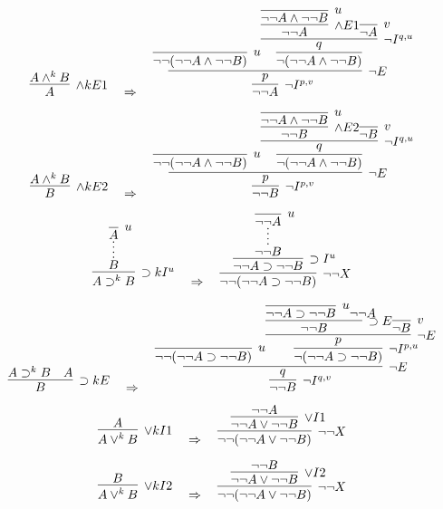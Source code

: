 \documentclass{article}
\begin{document}
\vspace{3em}
\[
\infer[\land kE1]{A}{
  A \land^k B
}
\quad \Rightarrow \quad
\infer[\neg I^{p,v}]{ \neg \neg A}{ 
  \infer[\neg E]{ p}{
    \infer[u]{
        \neg \neg (\neg \neg A \land \neg \neg B)
     }{}
     \infer[]{
        \neg (\neg \neg A \land \neg \neg B)
     }{
        \infer[\neg I^{q,u}]{ q}{
            \infer[\land E1]{\neg \neg A }{
                \infer[u]{\neg \neg A \land \neg \neg B}{}
            }
            \infer[v]{\neg A}{}
        }
     }
  }
}
\]

\vspace{3em}
\[
\infer[\land kE2]{B}{
  A \land^k B
}
\quad \Rightarrow \quad
\infer[\neg I^{p,v}]{\neg \neg B}{ 
  \infer[\neg E]{p}{
    \infer[u]{
        \neg \neg (\neg \neg A \land \neg \neg B)
     }{}
     \infer[]{
        \neg (\neg \neg A \land \neg \neg B)
     }{
        \infer[\neg I^{q,u}]{ q}{
            \infer[\land E2]{\neg \neg B }{
                \infer[u]{\neg \neg A \land \neg \neg B}{}
            }
            \infer[v]{\neg B}{}
        }
     }
  }
}
\]

\vspace{3em}
\[
\infer[\supset k I^u]{A \supset^k B}{
  \infer*[]{B}{
    \infer[u]{A}{}
  }
}
\quad \Rightarrow \quad
\infer[\neg \neg X ] {\neg \neg(\neg \neg A \supset \neg \neg B )}{
\infer[\supset  I^u]{\neg \neg A \supset \neg \neg B}{
  \infer*[]{\neg \neg B}{
    \infer[u]{\neg \neg A}{}
  }
}
}
\]

\vspace{3em}
\[
\infer[\supset kE]{B}{
    A \supset^k B & A
}
\quad \Rightarrow \quad
\infer[\neg I^{q,v}] {\neg \neg B }{
\infer[\neg E]{q}{
    \infer[u]{\neg \neg(\neg \neg A \supset \neg \neg B )}{}
    \infer[\neg I^{p,u}]{\neg(\neg \neg A \supset \neg \neg B )}{
        \infer[\neg E]{p}{
            \infer[\supset E]{\neg \neg B}{
                \infer[u]{\neg \neg A \supset \neg \neg B}{}
                {\neg \neg A}
            }
            \infer[v]{\neg B}{}
        }
    }
}
}
\]


\vspace{3em}
\[
\infer[\lor kI1]{A \lor^k B}{A}
\quad \Rightarrow \quad
\infer[\neg \neg X]{\neg \neg(\neg \neg A \lor \neg \neg B)}{
    \infer[\lor I1]{\neg \neg A \lor \neg \neg B}{\neg \neg A
        \infer[]{}{}
    }
}
\]

\vspace{3em}
\[
\infer[\lor kI2]{A \lor^k B}{B}
\quad \Rightarrow \quad
\infer[\neg \neg X]{\neg \neg(\neg \neg A \lor \neg \neg B)}{
    \infer[\lor I2]{\neg \neg A \lor \neg \neg B}{\neg \neg B
        \infer[]{}{}
    }
}
\]
\end{document}
